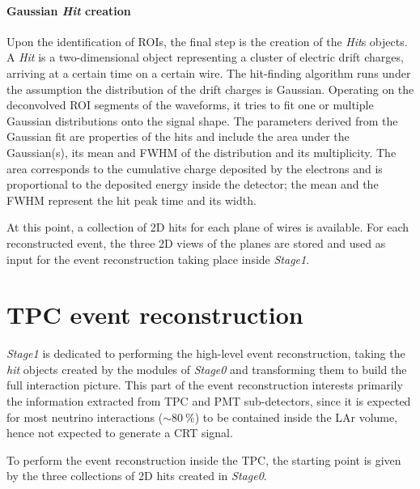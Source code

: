 \paragraph{Gaussian \emph{Hit} creation} Upon the identification of ROIs, the final step is the creation of the \emph{Hit}s objects. A \emph{Hit} is a two-dimensional object representing a cluster of electric drift charges, arriving at a certain time on a certain wire. The hit-finding algorithm runs under the assumption the distribution of the drift charges is Gaussian. Operating on the deconvolved ROI segments of the waveforms, it tries to fit one or multiple Gaussian distributions onto the signal shape. The parameters derived from the Gaussian fit are properties of the hits and include the area under the Gaussian(s), its mean and FWHM of the distribution and its multiplicity. The area corresponds to the cumulative charge deposited by the electrons and is proportional to the deposited energy inside the detector; the mean and the FWHM represent the hit peak time and its width. 

At this point, a collection of 2D hits for each plane of wires is available. For each reconstructed event, the three 2D views of the planes are stored and used as input for the event reconstruction taking place inside \emph{Stage1}. 

\section{TPC event reconstruction} \label{sec:TPC_reco_gen}

\emph{Stage1} is dedicated to performing the high-level event reconstruction, taking the \emph{hit} objects created by the modules of \emph{Stage0} and transforming them to build the full interaction picture. This part of the event reconstruction interests primarily the information extracted from TPC and PMT sub-detectors, since it is expected for most neutrino interactions (${\sim}\SI{80}{\percent}$) to be contained inside the LAr volume, hence not expected to generate a CRT signal. 

To perform the event reconstruction inside the TPC, the starting point is given by the three collections of 2D hits created in \emph{Stage0}.


